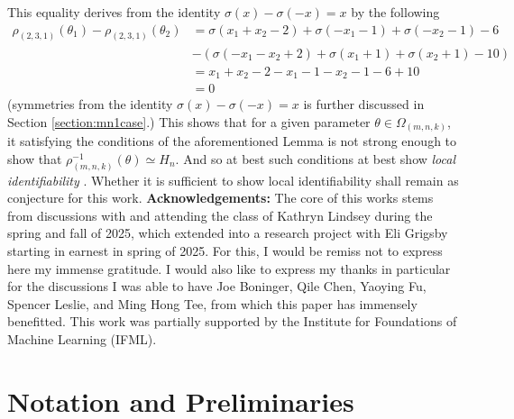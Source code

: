 \documentclass[11pt,letterpaper]{amsart}
\begin{document}
This equality derives from the identity $\sigma(x)-\sigma(-x)=x$ by the following
\begin{align*}
    \rho_{(2,3,1)}(\theta_1)-\rho_{(2,3,1)}(\theta_2) &= \sigma(x_1+x_2-2)+\sigma(-x_1-1) + \sigma(-x_2-1) - 6 \\
    &- (\sigma(-x_1-x_2+2)+\sigma(x_1+1) + \sigma(x_2+1) - 10)\\
    &= x_1+x_2 - 2 -x_1 - 1 -x_2 - 1-6+10\\
    &= 0
\end{align*}
(symmetries from the identity $\sigma(x)-\sigma(-x)=x$ is further discussed in Section \ref{section:mn1case}.) This shows that for a given parameter $\theta\in \Omega_{(m,n,k)}$, it satisfying the conditions of the aforementioned Lemma is not strong enough to show that $\rho_{(m,n,k)}^{-1}(\theta)\simeq H_n$. And so at best such conditions at best show \textit{local identifiability} \cite[Def. 6]{bonapellissier2022localidentifiabilitydeeprelu}. Whether it is sufficient to show local identifiability shall remain as conjecture for this work. 
\vskip 5pt
{\flushleft \bf Acknowledgements:} The core of this works stems from discussions with and attending the class of Kathryn Lindsey during the spring and fall of 2025, which extended into a research project with Eli Grigsby starting in earnest in spring of 2025. For this, I would be remiss not to express here my immense gratitude. I would also like to express my thanks in particular for the discussions I was able to have Joe Boninger, Qile Chen, Yaoying Fu, Spencer Leslie, and Ming Hong Tee, from which this paper has immensely benefitted. This work was partially supported by the Institute for Foundations of Machine Learning (IFML).
\section{Notation and Preliminaries}
\end{document}
